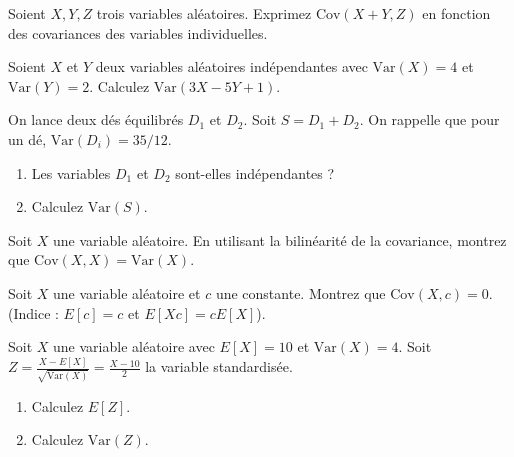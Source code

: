 \begin{exercicebox}
Soient $X, Y, Z$ trois variables aléatoires. Exprimez $\text{Cov}(X+Y, Z)$ en fonction des covariances des variables individuelles.
\end{exercicebox}

\begin{exercicebox}
Soient $X$ et $Y$ deux variables aléatoires indépendantes avec $\text{Var}(X) = 4$ et $\text{Var}(Y) = 2$.
Calculez $\text{Var}(3X - 5Y + 1)$.
\end{exercicebox}

\begin{exercicebox}
On lance deux dés équilibrés $D_1$ et $D_2$. Soit $S = D_1 + D_2$.
On rappelle que pour un dé, $\text{Var}(D_i) = 35/12$.
\begin{enumerate}
    \item Les variables $D_1$ et $D_2$ sont-elles indépendantes ?
    \item Calculez $\text{Var}(S)$.
\end{enumerate}
\end{exercicebox}

\begin{exercicebox}
Soit $X$ une variable aléatoire. En utilisant la bilinéarité de la covariance, montrez que $\text{Cov}(X, X) = \text{Var}(X)$.
\end{exercicebox}

\begin{exercicebox}
Soit $X$ une variable aléatoire et $c$ une constante.
Montrez que $\text{Cov}(X, c) = 0$. (Indice : $E[c]=c$ et $E[Xc] = cE[X]$).
\end{exercicebox}


\begin{exercicebox}
Soit $X$ une variable aléatoire avec $E[X] = 10$ et $\text{Var}(X) = 4$.
Soit $Z = \frac{X - E[X]}{\sqrt{\text{Var}(X)}} = \frac{X - 10}{2}$ la variable standardisée.
\begin{enumerate}
    \item Calculez $E[Z]$.
    \item Calculez $\text{Var}(Z)$.
\end{enumerate}
\end{exercicebox}

